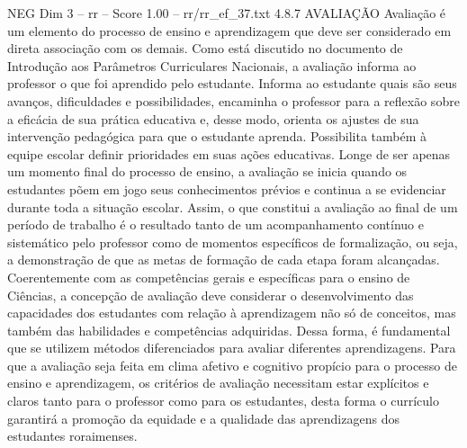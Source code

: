 \begin{textsample}{NEG Dim 3 – rr – Score 1.00 – rr/rr\_ef\_37.txt}  \label{ex:f3_neg_067}
4.8.7 AVALIAÇÃO Avaliação é um elemento do processo de ensino e aprendizagem que deve ser considerado em direta associação com os demais.
Como está discutido no documento de Introdução aos Parâmetros Curriculares Nacionais, a avaliação informa ao professor o que foi aprendido pelo estudante.
Informa ao estudante quais são seus avanços, dificuldades e possibilidades, encaminha o professor para a reflexão sobre a eficácia de sua prática educativa e, desse modo, orienta os ajustes de sua intervenção pedagógica para que o estudante aprenda.
Possibilita também à equipe escolar definir prioridades em suas ações educativas.
Longe de ser apenas um momento final do processo de ensino, a avaliação se inicia quando os estudantes põem em jogo seus conhecimentos prévios e continua a se evidenciar durante toda a situação escolar.
Assim, o que constitui a avaliação ao final de um período de trabalho é o resultado tanto de um acompanhamento contínuo e sistemático pelo professor como de momentos específicos de formalização, ou seja, a demonstração de que as metas de formação de cada etapa foram alcançadas.
Coerentemente com as competências gerais e específicas para o ensino de Ciências, a concepção de avaliação deve considerar o desenvolvimento das capacidades dos estudantes com relação à aprendizagem não só de conceitos, mas também das habilidades e competências adquiridas.
Dessa forma, é fundamental que se utilizem métodos diferenciados para avaliar diferentes aprendizagens.
Para que a avaliação seja feita em clima afetivo e cognitivo propício para o processo de ensino e aprendizagem, os critérios de avaliação necessitam estar explícitos e claros tanto para o professor como para os estudantes, desta forma o currículo garantirá a promoção da equidade e a qualidade das aprendizagens dos estudantes roraimenses.

\end{textsample}
